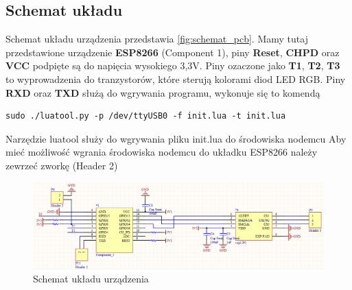 \subsection{Schemat układu}

Schemat układu urządzenia przedstawia \autoref{fig:schemat_pcb}. Mamy tutaj przedstawione urządzenie \textbf{ESP8266} (Component 1), piny \textbf{Reset}, \textbf{CHPD} oraz \textbf{VCC} podpięte są do napięcia wysokiego 3,3V. Piny ozaczone jako \textbf{T1}, \textbf{T2}, \textbf{T3} to wyprowadzenia do tranzystorów, które sterują kolorami diod LED RGB. Piny \textbf{RXD} oraz \textbf{TXD} służą do wgrywania programu, wykonuje się to komendą 
\begin{lstlisting}
sudo ./luatool.py -p /dev/ttyUSB0 -f init.lua -t init.lua
\end{lstlisting} 
Narzędzie luatool\cite{luatool-www} służy do wgrywania pliku init.lua do środowiska nodemcu\cite{nodemcu-www} 
Aby mieć możliwość wgrania środowiska nodemcu\cite{nodemcu-www} do układku ESP8266 należy zewrzeć zworkę (Header 2)

\begin{figure}[!htbp]
	\centering
	\includegraphics[width=1.0\textwidth]{images/fig04-schemat.png}
	\caption[Schemat układu urządzenia.]{Schemat układu urządzenia}
	\label{fig:schemat_pcb}
\end{figure}

